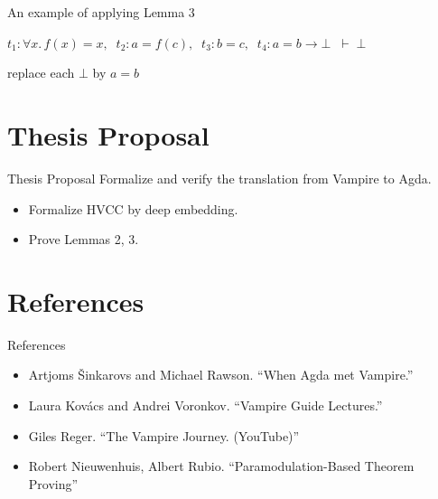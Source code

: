 \documentclass[aspectratio=43]{beamer}
\begin{document}
\begin{frame}{An example of applying Lemma 3}
    \footnotesize
    \begin{center}
    $t_1\!:\!\forall x.\, f(x) = x,\;\;
     t_2\!:\! a = f(c),\;\;
     t_3\!:\! b = c,\;\;
     t_4\!:\! a = b \to \boxed{\bot}
     \;\;\vdash\; \boxed{\bot}$
    \end{center}
    \vfill
    \scriptsize
    \begin{mathpar}
    \end{mathpar}
    {\footnotesize replace each $\boxed{\bot}$ by $a = b$}
\end{frame}

\section{Thesis Proposal}
\begin{frame}{Thesis Proposal}
    Formalize and verify the translation from Vampire to Agda. \\
    \begin{itemize}
        \item Formalize HVCC by deep embedding.
        \item Prove Lemmas 2, 3. \\
    \end{itemize}
\end{frame}

\section{References}
\begin{frame}{References}
    \scriptsize
    \begin{itemize}
        \item Artjoms Šinkarovs and Michael Rawson. ``When Agda met Vampire.''
        \item Laura Kovács and Andrei Voronkov.  ``Vampire Guide Lectures.''
        \item Giles Reger. ``The Vampire Journey. (YouTube)''
        \item Robert Nieuwenhuis, Albert Rubio. ``Paramodulation-Based Theorem Proving''
    \end{itemize}
\end{frame}
\end{document}
